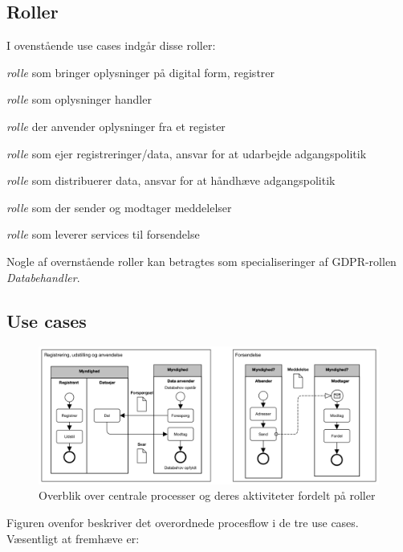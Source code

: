 \subsection{Roller}\label{roller}

I ovenstående use cases indgår disse roller:

\begin{description}
\tightlist
\item[Registrant]
\emph{rolle} som bringer oplysninger på digital form, registrer
\item[Datasubject]
\emph{rolle} som oplysninger handler
\item[Dataanvender]
\emph{rolle} der anvender oplysninger fra et register
\item[Dataejer]
\emph{rolle} som ejer registreringer/data, ansvar for at udarbejde
adgangspolitik
\item[Datadistributør]
\emph{rolle} som distribuerer data, ansvar for at håndhæve
adgangspolitik
\item[Messaging User]
\emph{rolle} som der sender og modtager meddelelser
\item[Messaging Provider]
\emph{rolle} som leverer services til forsendelse
\end{description}

Nogle af overnstående roller kan betragtes som specialiseringer af
GDPR-rollen \emph{Databehandler}.

\subsection{Use cases}\label{use-cases}

\begin{figure}
\centering
\includegraphics[width=\textwidth]{figures/patterns.png}
\caption{Overblik over centrale processer og deres aktiviteter fordelt
på roller}
\end{figure}

Figuren ovenfor beskriver det overordnede procesflow i de tre use cases.
Væsentligt at fremhæve er:

